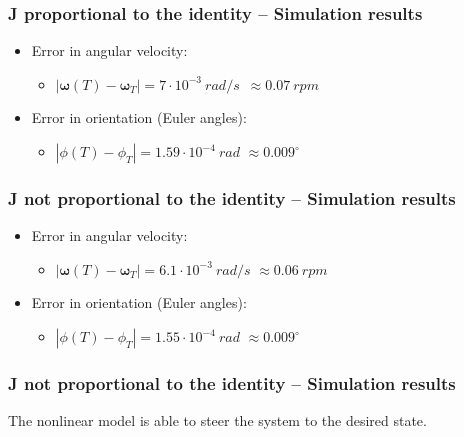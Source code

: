 \documentclass{beamer}
\begin{document}
\begin{frame} \frametitle{J proportional to the identity -- Simulation results}
	\begin{itemize}
		\item Error in angular velocity:
		\begin{itemize}
			\item[] \begin{center} $|\bm{\omega}(T)-\bm{\omega}_T| = 7\cdot 10^{-3}\ rad/s$ $\approx  0.07\ rpm$ \end{center}
		\end{itemize}
		\item Error in orientation (Euler angles):
		\begin{itemize}
			\item[] \begin{center} $|\phi(T)-\phi_T| = 1.59\cdot 10^{-4}\ rad$ $\approx  0.009^\circ$ \end{center}
		\end{itemize}
	\end{itemize}
\end{frame}

\begin{frame} \frametitle{J not proportional to the identity -- Simulation results}
	\begin{itemize}
		\item Error in angular velocity:
		\begin{itemize}
			\item[] \begin{center} $|\bm{\omega}(T)-\bm{\omega}_T| = 6.1\cdot 10^{-3}\ rad/s$ $\approx  0.06\ rpm$ \end{center}
		\end{itemize}
		\item Error in orientation (Euler angles):
		\begin{itemize}
			\item[] \begin{center} $|\phi(T)-\phi_T| = 1.55\cdot 10^{-4}\ rad$ $\approx  0.009^\circ$ \end{center}
		\end{itemize}
	\end{itemize}
\end{frame}

\begin{frame} \frametitle{J not proportional to the identity -- Simulation results}
	The nonlinear model \alert{is able} to steer the system to the desired state.
\end{frame}
\end{document}
